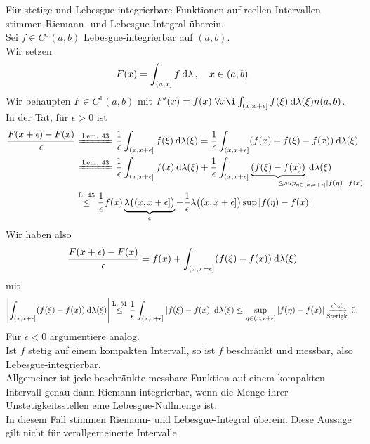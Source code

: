 \documentclass[skript.tex]{subfiles}
\begin{document}
	\begin{bem}
		Für stetige und Lebesgue-integrierbare Funktionen auf reellen Intervallen stimmen
		Riemann- und Lebesgue-Integral überein. \\
		Sei $f \in C^0 (a,b)$ Lebesgue-integrierbar auf $(a,b)$. \\
		Wir setzen
		\[
			F(x) = \int_{(a,x]} f \: \mathrm{d}\lambda\,, \quad x \in (a,b)
		\]
		Wir behaupten $F \in C^1(a,b)$ mit $F'(x) = f(x) \; \forall x \i\int_{(x,x+\epsilon]} f(\xi) \md \lambda(\xi)n (a,b)$. \\ 
		In der Tat, für $\epsilon > 0$ ist
		\begin{align*}
			\frac{F(x+\epsilon)-F(x)}{\epsilon} &\xlongequal{\text{Lem. 43}}
			\frac{1}{\epsilon} \int_{(x,x+\epsilon]} f(\xi) \md \lambda(\xi)
			= \frac{1}{\epsilon} \int_{(x,x+\epsilon]} (f(x)+f(\xi)-f(x)) \md \lambda(\xi)
			\\ &\xlongequal{\text{Lem. 43}}
			\frac{1}{\epsilon}\int_{(x,x+\epsilon]} f(x) \md \lambda(\xi)
			+ \frac{1}{\epsilon}\int_{(x,x+\epsilon]} 
			\underbrace{(f(\xi)-f(x))}_{
				\mathrlap{
					\leq sup_{\eta\in(x,x+\epsilon]} |f(\eta)-f(x)|
				}
			}
			\md \lambda(\xi) \\
			&\overset{\text{L. 45}}{\leq}
			\frac{1}{\epsilon} f(x)
			\underbrace{\lambda\big((x,x+\epsilon]\big)}_\epsilon
			+ \frac{1}{\epsilon} \lambda\big((x,x+\epsilon]\big) \sup | f(\eta)-f(x)|
		\end{align*}
		Wir haben also
		\[
			\frac{F(x+\epsilon)-F(x)}{\epsilon}
			= f(x) + \int_{(x,x+\epsilon]}(f(\xi)-f(x)) \: \mathrm{d} \lambda(\xi)
		\]
		mit
		\[
			\left|\int_{(x,x+\epsilon]}(f(\xi)-f(x)) \: \mathrm{d} \lambda(\xi)\right|
			\overset{\text{L. 51}}{\leq}
			\frac{1}{\epsilon} \int_{(x,x+\epsilon]}|f(\xi)-f(x)| \: \mathrm{d} \lambda(\xi)
			\leq \sup_{\eta\in(x,x+\epsilon]} |f(\eta)-f(x)|
			\underset{\text{Stetigk.}}{\xrightarrow{\epsilon\searrow 0}} 0.
		\]
		Für $\epsilon < 0$ argumentiere analog. \\
		Ist $f$ stetig auf einem kompakten Intervall, so ist $f$ beschränkt und messbar,
		also Lebesgue-integrierbar.\\
		
		Allgemeiner ist jede beschränkte messbare Funktion auf einem kompakten
		Intervall genau dann Riemann-integrierbar, wenn die Menge ihrer Unstetigkeitsstellen eine Lebesgue-Nullmenge ist. \\
		In diesem Fall stimmen Riemann- und Lebesgue-Integral überein. Diese Aussage gilt nicht für verallgemeinerte Intervalle.
	\end{bem}
\end{document}

